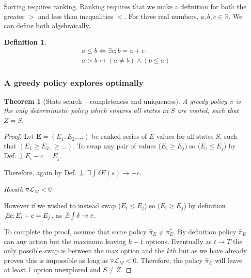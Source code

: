 \documentclass[9pt,twocolumn,twoside]{pnas-new}
\newtheorem{theorem}{Theorem}
\newtheorem{definition}{Definition}
\begin{document}
Sorting requires ranking. Ranking requires that we make a definition for both the greater $>$ and less than inequalities $<$. For three real numbers, ${a,b,c} \in \mathbb{R}$. We can define both algebraically.

\begin{definition} \label{def:ineq}
    \begin{align}
        a \leq b \Leftrightarrow \exists c; b = a + c \\
        a > b \leftrightarrow (a \neq b) \wedge (b \leq a) 
    \end{align}
\end{definition}

\subsubsection*{A greedy policy explores optimally}
\begin{theorem}[State search -- completeness and uniqueness] \label{theorem:Z}
A greedy policy $\pi$ is the only deterministic policy which ensures all states in $S$ are visited, such that $Z = S$.
\end{theorem}
\begin{proof}    
    Let $\textbf{E} = (E_1, E_2, ...)$ be ranked series of $E$ values for all states $S$, such that $(E_1 \geq E_2, \geq ...)$. To swap any pair of values ($E_i \geq E_j$) so ($E_i \leq E_j$) by Def.~\ref{def:ineq} $E_i - c = E_j$.  

    Therefore, again by Def.~\ref{def:ineq}, $\exists \int \delta E(s) \rightarrow -c$. 

    \textit{Recall}: $\triangledown \mathcal{L}_M < 0$

    However if we wished to instead swap ($E_i \leq E_j$) so ($E_i \geq E_j$) by definition $\not \exists c; E_i + c = E_j$, as $\not \exists \int \delta \rightarrow c$. 

    To complete the proof, assume that some policy $\hat \pi_E \neq \pi^*_E$. By definition policy $\hat \pi_E$ can any action but the maximum leaving $k-1$ options. Eventually as $t \rightarrow T$ the only possible swap is between the max option and the $kth$ but as we have already proven this is impossible as long as $\triangledown \mathcal{L}_M < 0$. Therefore, the policy $\hat \pi_E$ will leave at least 1 option unexplored and $S \neq Z$.
\end{proof}
\end{document}
